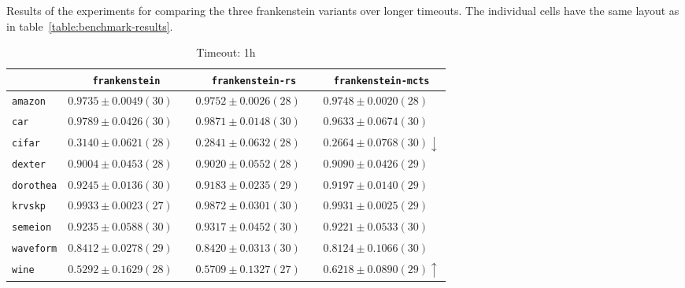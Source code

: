 \begin{table}[ht]
    \caption[Results of the experiments for comparing the three frankenstein variants over longer timeouts.]{
        Results of the experiments for comparing the three frankenstein variants over longer timeouts.
        The individual cells have the same layout as in table~\ref{table:benchmark-results}.
    }
    \label{table:influence-results}
    \renewcommand{\arraystretch}{1.25}
    \begin{subtable}{\textwidth}
        \centering
        \caption{Timeout: 1h}
        \begin{tabular}{l|ccc}
            & \texttt{frankenstein}  & \texttt{frankenstein-rs}  & \texttt{frankenstein-mcts} \\
            \hline
            \texttt{amazon} & $ 0.9735 \pm 0.0049 (30) \phantom{\downarrow}$ & $ 0.9752 \pm 0.0026 (28) \phantom{\downarrow}$ & $ 0.9748 \pm 0.0020 (28) \phantom{\downarrow}$\\
            \texttt{car} & $ 0.9789 \pm 0.0426 (30) \phantom{\downarrow}$ & $ 0.9871 \pm 0.0148 (30) \phantom{\downarrow}$ & $ 0.9633 \pm 0.0674 (30) \phantom{\downarrow}$\\
            \texttt{cifar} & $ 0.3140 \pm 0.0621 (28) \phantom{\downarrow}$ & $ 0.2841 \pm 0.0632 (28) \phantom{\downarrow}$ & $ 0.2664 \pm 0.0768 (30) \downarrow$\\
            \texttt{dexter} & $ 0.9004 \pm 0.0453 (28) \phantom{\downarrow}$ & $ 0.9020 \pm 0.0552 (28) \phantom{\downarrow}$ & $ 0.9090 \pm 0.0426 (29) \phantom{\downarrow}$\\
            \texttt{dorothea} & $ 0.9245 \pm 0.0136 (30) \phantom{\downarrow}$ & $ 0.9183 \pm 0.0235 (29) \phantom{\downarrow}$ & $ 0.9197 \pm 0.0140 (29) \phantom{\downarrow}$\\
            \texttt{krvskp} & $ 0.9933 \pm 0.0023 (27) \phantom{\downarrow}$ & $ 0.9872 \pm 0.0301 (30) \phantom{\downarrow}$ & $ 0.9931 \pm 0.0025 (29) \phantom{\downarrow}$\\
            \texttt{semeion} & $ 0.9235 \pm 0.0588 (30) \phantom{\downarrow}$ & $ 0.9317 \pm 0.0452 (30) \phantom{\downarrow}$ & $ 0.9221 \pm 0.0533 (30) \phantom{\downarrow}$\\
            \texttt{waveform} & $ 0.8412 \pm 0.0278 (29) \phantom{\downarrow}$ & $ 0.8420 \pm 0.0313 (30) \phantom{\downarrow}$ & $ 0.8124 \pm 0.1066 (30) \phantom{\downarrow}$\\
            \texttt{wine} & $ 0.5292 \pm 0.1629 (28) \phantom{\downarrow}$ & $ 0.5709 \pm 0.1327 (27) \phantom{\downarrow}$ & $ 0.6218 \pm 0.0890 (29) \uparrow$\\

\end{tabular}
\end{subtable}
\end{table}
